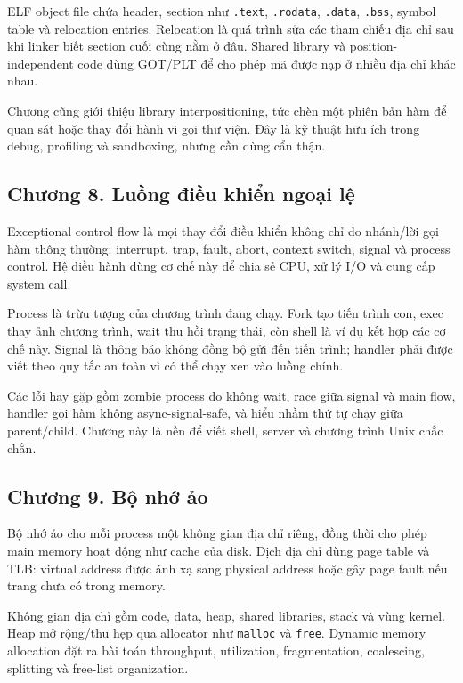 \documentclass[11pt]{article}
\begin{document}
ELF object file chứa header, section như \texttt{.text}, \texttt{.rodata},
\texttt{.data}, \texttt{.bss}, symbol table và relocation entries. Relocation là
quá trình sửa các tham chiếu địa chỉ sau khi linker biết section cuối cùng nằm ở
đâu. Shared library và position-independent code dùng GOT/PLT để cho phép mã
được nạp ở nhiều địa chỉ khác nhau.

Chương cũng giới thiệu library interpositioning, tức chèn một phiên bản hàm để
quan sát hoặc thay đổi hành vi gọi thư viện. Đây là kỹ thuật hữu ích trong debug,
profiling và sandboxing, nhưng cần dùng cẩn thận.

\subsection*{Chương 8. Luồng điều khiển ngoại lệ}

Exceptional control flow là mọi thay đổi điều khiển không chỉ do nhánh/lời gọi
hàm thông thường: interrupt, trap, fault, abort, context switch, signal và process
control. Hệ điều hành dùng cơ chế này để chia sẻ CPU, xử lý I/O và cung cấp
system call.

Process là trừu tượng của chương trình đang chạy. Fork tạo tiến trình con, exec
thay ảnh chương trình, wait thu hồi trạng thái, còn shell là ví dụ kết hợp các
cơ chế này. Signal là thông báo không đồng bộ gửi đến tiến trình; handler phải
được viết theo quy tắc an toàn vì có thể chạy xen vào luồng chính.

Các lỗi hay gặp gồm zombie process do không wait, race giữa signal và main
flow, handler gọi hàm không async-signal-safe, và hiểu nhầm thứ tự chạy giữa
parent/child. Chương này là nền để viết shell, server và chương trình Unix chắc
chắn.

\subsection*{Chương 9. Bộ nhớ ảo}

Bộ nhớ ảo cho mỗi process một không gian địa chỉ riêng, đồng thời cho phép
main memory hoạt động như cache của disk. Dịch địa chỉ dùng page table và TLB:
virtual address được ánh xạ sang physical address hoặc gây page fault nếu trang
chưa có trong memory.

Không gian địa chỉ gồm code, data, heap, shared libraries, stack và vùng kernel.
Heap mở rộng/thu hẹp qua allocator như \texttt{malloc} và \texttt{free}. Dynamic
memory allocation đặt ra bài toán throughput, utilization, fragmentation, coalescing,
splitting và free-list organization.
\end{document}
